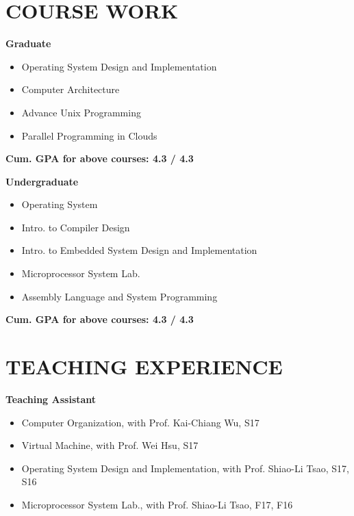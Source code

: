\documentclass[margin, 9pt]{res} %
\begin{document}
\begin{resume}

\section{COURSE WORK}
{\large\textbf{Graduate}}\\
\vspace*{-10pt}
\begin{itemize}[leftmargin=*] \itemsep -3pt
\vspace*{-5pt}
\item Operating System Design and Implementation
\item Computer Architecture
\item Advance Unix Programming
\item Parallel Programming in Clouds
\end{itemize}
\textbf{Cum. GPA for above courses: 4.3 / 4.3 }

\medskip
{\large\textbf{Undergraduate}}\\
\vspace*{-10pt}
\begin{itemize}[leftmargin=*] \itemsep -3pt
\vspace*{-5pt}
\item Operating System
\item Intro. to Compiler Design
\item Intro. to Embedded System Design and Implementation
\item Microprocessor System Lab.
\item Assembly Language and System Programming
\end{itemize}
\textbf{Cum. GPA for above courses: 4.3 / 4.3 }

\section{TEACHING EXPERIENCE}
{\large\textbf{Teaching Assistant}}\\
\vspace*{-10pt}
\begin{itemize}[leftmargin=*] \itemsep -3pt
\vspace*{-5pt}
\item Computer Organization, with Prof. Kai-Chiang Wu, S17
\item Virtual Machine, with Prof. Wei Hsu, S17
\item Operating System Design and Implementation, with Prof. Shiao-Li Tsao, S17, S16
\item Microprocessor System Lab., with Prof. Shiao-Li Tsao, F17, F16
\end{itemize}


\end{resume}
\end{document}
